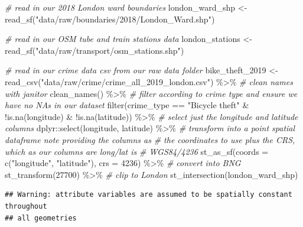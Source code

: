 \documentclass[
]{book}
\newenvironment{Shaded}{\begin{snugshade}}{\end{snugshade}}
\newcommand{\AttributeTok}[1]{\textcolor[rgb]{0.77,0.63,0.00}{#1}}
\newcommand{\CommentTok}[1]{\textcolor[rgb]{0.56,0.35,0.01}{\textit{#1}}}
\newcommand{\DecValTok}[1]{\textcolor[rgb]{0.00,0.00,0.81}{#1}}
\newcommand{\FunctionTok}[1]{\textcolor[rgb]{0.00,0.00,0.00}{#1}}
\newcommand{\NormalTok}[1]{#1}
\newcommand{\OtherTok}[1]{\textcolor[rgb]{0.56,0.35,0.01}{#1}}
\newcommand{\SpecialCharTok}[1]{\textcolor[rgb]{0.00,0.00,0.00}{#1}}
\newcommand{\StringTok}[1]{\textcolor[rgb]{0.31,0.60,0.02}{#1}}
\begin{document}
\begin{Shaded}
\begin{Highlighting}[]
\CommentTok{\# read in our 2018 London ward boundaries}
\NormalTok{london\_ward\_shp }\OtherTok{\textless{}{-}} \FunctionTok{read\_sf}\NormalTok{(}\StringTok{"data/raw/boundaries/2018/London\_Ward.shp"}\NormalTok{)}

\CommentTok{\# read in our OSM tube and train stations data}
\NormalTok{london\_stations }\OtherTok{\textless{}{-}} \FunctionTok{read\_sf}\NormalTok{(}\StringTok{"data/raw/transport/osm\_stations.shp"}\NormalTok{)}

\CommentTok{\# read in our crime data csv from our raw data folder}
\NormalTok{bike\_theft\_2019 }\OtherTok{\textless{}{-}} \FunctionTok{read\_csv}\NormalTok{(}\StringTok{"data/raw/crime/crime\_all\_2019\_london.csv"}\NormalTok{) }\SpecialCharTok{\%\textgreater{}\%}
  \CommentTok{\# clean names with janitor}
  \FunctionTok{clean\_names}\NormalTok{() }\SpecialCharTok{\%\textgreater{}\%}
  \CommentTok{\# filter according to crime type and ensure we have no NAs in our dataset}
  \FunctionTok{filter}\NormalTok{(crime\_type }\SpecialCharTok{==} \StringTok{"Bicycle theft"} \SpecialCharTok{\&} \SpecialCharTok{!}\FunctionTok{is.na}\NormalTok{(longitude) }\SpecialCharTok{\&} \SpecialCharTok{!}\FunctionTok{is.na}\NormalTok{(latitude)) }\SpecialCharTok{\%\textgreater{}\%}
  \CommentTok{\# select just the longitude and latitude columns}
\NormalTok{  dplyr}\SpecialCharTok{::}\FunctionTok{select}\NormalTok{(longitude, latitude) }\SpecialCharTok{\%\textgreater{}\%}
  \CommentTok{\# transform into a point spatial dataframe note providing the columns as}
  \CommentTok{\# the coordinates to use plus the CRS, which as our columns are long/lat is}
  \CommentTok{\# WGS84/4236}
  \FunctionTok{st\_as\_sf}\NormalTok{(}\AttributeTok{coords =} \FunctionTok{c}\NormalTok{(}\StringTok{"longitude"}\NormalTok{, }\StringTok{"latitude"}\NormalTok{), }\AttributeTok{crs =} \DecValTok{4236}\NormalTok{) }\SpecialCharTok{\%\textgreater{}\%}
  \CommentTok{\# convert into BNG}
  \FunctionTok{st\_transform}\NormalTok{(}\DecValTok{27700}\NormalTok{) }\SpecialCharTok{\%\textgreater{}\%}
  \CommentTok{\# clip to London}
  \FunctionTok{st\_intersection}\NormalTok{(london\_ward\_shp)}
\end{Highlighting}
\end{Shaded}

\begin{verbatim}
## Warning: attribute variables are assumed to be spatially constant throughout
## all geometries
\end{verbatim}
\end{document}
